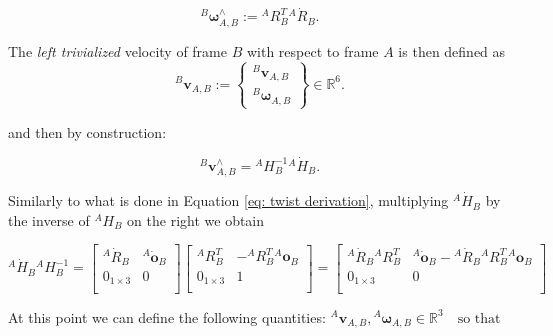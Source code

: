     \begin{equation}
    {}^{B}\bm{\omega}^{\wedge}_{A,B} := {}^{A} {R}^{T}_B{}^{A}\dot{ {R}}_B.
    \end{equation}

    The \textit{left trivialized} velocity of frame $B$ with respect to frame $A$ is then defined as 
    \begin{equation}
    {}^{B} \mathbf{v}_{A,B} := \begin{Bmatrix} {}^{B}\bm{v}_{A,B} \\ {}^{B}\bm{\omega}_{A,B} \end{Bmatrix} \in \mathbb{R}^6.
    \label{eq: Left trivialized veocity}
    \end{equation}

    and then by construction:

    \begin{equation}
    {}^{B} \mathbf{v}^{\wedge}_{A,B} = {}^{A} {H}^{-1}_B {}^{A}\dot{ {H}}_B.
    \label{eq: twist definition}
    \end{equation}

    Similarly to what is done in Equation \eqref{eq: twist derivation}, multiplying ${}^{A}\dot{ {H}}_B$ by the inverse of ${}^{A} {H}_B$ on the right we obtain

    \begin{equation}
    {}^{A}\dot{ {H}}_B{}^{A} {H}^{-1}_B = \begin{bmatrix}
    {}^{A}\dot{ {R}}_B & {}^{A}\dot{ \mathbf{o}}_B \\
     {0}_{1 \times 3} & 0 \\
    \end{bmatrix} \begin{bmatrix}
    {}^{A} {R}^{T}_B & -{}^{A} {R}^{T}_B{}^{A} \mathbf{o}_B \\
     {0}_{1 \times 3} & 1 \\
    \end{bmatrix}  = \begin{bmatrix}
    {}^{A}\dot{ {R}}_B{}^{A} {R}^{T}_B & {}^{A}\dot{ \mathbf{o}}_B -  {}^{A}\dot{ {R}}_B{}^{A} {R}^{T}_B{}^{A} \mathbf{o}_B \\
     {0}_{1 \times 3} & 0 \\
    \end{bmatrix}
    \end{equation}
    
    At this point we can define the following quantities: ${}^{A}\bm{v}_{A,B}, {}^{A}\bm{\omega}_{A,B} \in \mathbb{R}^3 \quad \text{so that}$


